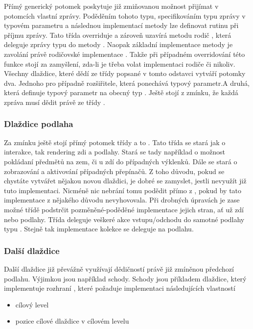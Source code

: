 Přímý generický potomek  poskytuje již zmiňovanou možnost přijímat
v potomcích vlastní zprávy. Poděděním tohoto typu, specifikováním typu zprávy v typovém parametru a následnou implementací metody 
 lze definovat rutinu při příjmu zprávy. Tato třída overriduje a zároveň uzavírá metodu rodič ,
která deleguje zprávy typu  do metody . Naopak základní implementace metody 
je zavolání právě rodičovské implementace . Takže při případném overridování této funkce
stojí za zamyšlení, zda-li  je třeba volat implementaci rodiče či nikoliv. Všechny dlaždice, které dědí ze třídy
popsané v tomto odstavci vytváří potomky dva. Jednoho pro případně rozšiřitele, která ponechává 
typový parametr.A druhá, která definuje typový parametr na obecný typ . Ještě stojí z zmínku,
že každá zpráva musí dědit právě ze třídy .

\subsubsection{Dlaždice podlaha}
Za zmínku ještě stojí přímý potomek třídy  a 
to .  Tato třída se stará jak o interakce, tak rendering
zdi a podlahy. Stará se tady například o možnost pokládaní předmětů na zem, či u zdí do případných výklenků. 
Dále se stará  o zobrazování a aktivování případných přepínačů. Z toho důvodu, pokud se chystáte
vytvářet nějakou novou dlaždici, je dobré se zamyslet, jestli  nevyužít již tuto implementaci. Nicméně nic
nebrání tomu podědit přímo z , pokud by tato implementace z
nějakého důvodu nevyhovovala. Při drobných úpravách je zase možné třídě podstrčit pozměněné-poděděné implementace 
jejich stran, ať už zdí nebo podlahy. Třída deleguje veškeré akce vstupu/odchodu do samotné podlahy
typu . Stejně tak implementace kolekce   se deleguje na podlahu.

\subsubsection{Další dlaždice}
Další dlaždice již převážně využívají dědičností právě již zmíněnou předchozí podlahu. Výjimkou jsou například schody.
Schody jsou příkladem  dlaždice, který implementuje rozhraní  ,  které požaduje implementaci 
následujících vlastností
\begin{itemize}
\item cílový level
\item pozice cílové dlaždice v cílovém levelu
\end{itemize}

